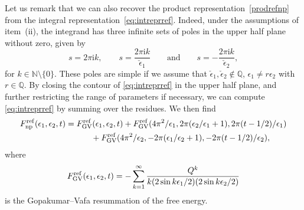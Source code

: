 \documentclass[pdftex]{sigma}
\numberwithin{equation}{section}
\begin{document}
Let us remark that we can also recover the product representation~\eqref{prodrefnp} from the integral representation~\eqref{eq:intreprref}. Indeed, under the assumptions of item~(ii), the integrand has three infinite sets of poles in the upper half plane without zero, given by
\begin{equation*}
s= 2\pi \mathrm{i} k, \qquad s=\frac{2\pi \mathrm{i} k }{\check{\epsilon}_1} \qquad \textrm{and} \qquad s=-\frac{2\pi \mathrm{i} k }{\check{\epsilon}_2},
\end{equation*}
for $k \in \mathbb{N}\setminus\{0\}$. These poles are simple if we assume that $\check{\epsilon}_1,\check{\epsilon}_2\notin \mathbb{Q}$, $ \epsilon_1 \ne r \epsilon_2$ with $r \in \mathbb{Q}$. By closing the contour of \eqref{eq:intreprref} in the upper half plane, and further restricting the range of parameters if necessary, we can compute \eqref{eq:intreprref} by summing over the residues. We then find
\begin{gather}
F^{\rm ref}_{{\rm np}}(\epsilon_1,\epsilon_2,t) = F^{{\rm ref}}_{{\rm GV}}(\epsilon_1,\epsilon_2,t) + F_{{\rm GV}}^{{\rm ref}}(4\pi^2/\epsilon_1,2\pi (\epsilon_2/\epsilon_1+1),2\pi (t-1/2)/\epsilon_1)
\nonumber\\
\hphantom{F^{\rm ref}_{{\rm np}}(\epsilon_1,\epsilon_2,t) =}{}
 + F_{{\rm GV}}^{{\rm ref}}(4\pi^2/\epsilon_2,-2\pi (\epsilon_1/\epsilon_2+1),-2\pi (t-1/2)/\epsilon_2),\label{eq:refnpGVform}
\end{gather}
where
\begin{equation*}
F^{{\rm ref}}_{{\rm GV}}(\epsilon_1,\epsilon_2,t)= -\sum_{k=1}^{\infty} \frac{Q^k}{k(2\sin k\epsilon_1/2)(2\sin k\epsilon_2/2)}
\end{equation*}
is the Gopakumar--Vafa resummation of the free energy.
\end{document}
